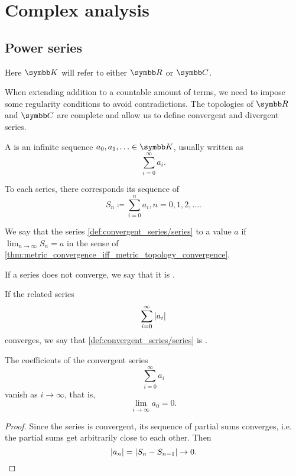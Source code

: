 \section{Complex analysis}\label{subsec:complex_analysis}
\subsection{Power series}\label{subsec:power_series}

Here \( \K \) will refer to either \( \R \) or \( \C \).

\begin{definition}\label{def:convergent_series}
  When extending addition to a countable amount of terms, we need to impose some regularity conditions to avoid contradictions. The topologies of \( \R \) and \( \C \) are complete and allow us to define convergent and divergent series.

  A  is an infinite sequence \( a_0, a_1, \ldots \in \K \), usually written as
  \begin{equation}\label{def:convergent_series/series}
    \sum_{i=0}^\infty a_i.
  \end{equation}

  To each series, there corresponds its sequence of 
  \begin{equation*}
    S_n \coloneqq \sum_{i=0}^n a_i, n = 0, 1, 2, \ldots.
  \end{equation*}

  We say that the series \cref{def:convergent_series/series}  to a value \( a \) if \( \lim_{n \to \infty} S_n = a \) in the sense of \cref{thm:metric_convergence_iff_metric_topology_convergence}.

  If a series does not converge, we say that it is .

  If the related series
  \begin{equation*}
    \sum_{i=0}^\infty \left\vert a_i \right\vert
  \end{equation*}
  converges, we say that \cref{def:convergent_series/series} is .
\end{definition}

\begin{proposition}\label{thm:convergent_series_coefficients_vanish}
  The coefficients of the convergent series
  \begin{equation*}
    \sum_{i=0}^\infty a_i
  \end{equation*}
  vanish as \( i \to \infty \), that is,
  \begin{equation*}
    \lim_{i \to \infty} a_0 = 0.
  \end{equation*}
\end{proposition}
\begin{proof}
  Since the series is convergent, its sequence of partial sums converges, i.e. the partial sums get arbitrarily close to each other. Then
  \begin{equation*}
    \left\vert a_n \right\vert = \left\vert S_n - S_{n-1} \right\vert \to 0.
  \end{equation*}
\end{proof}

